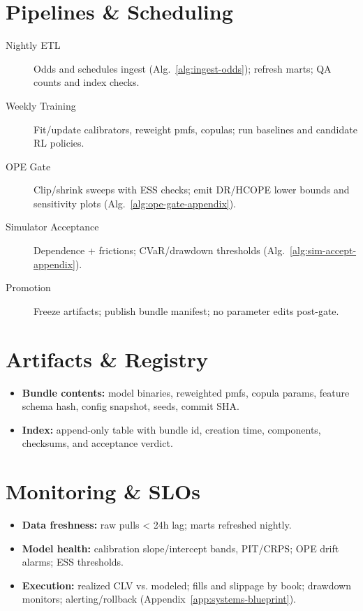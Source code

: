 \section{Pipelines \& Scheduling}
\begin{description}
  \item[Nightly ETL] Odds and schedules ingest (Alg.~\ref{alg:ingest-odds}); refresh marts; QA counts and index checks.
  \item[Weekly Training] Fit/update calibrators, reweight pmfs, copulas; run baselines and candidate RL policies.
  \item[OPE Gate] Clip/shrink sweeps with ESS checks; emit DR/HCOPE lower bounds and sensitivity plots (Alg.~\ref{alg:ope-gate-appendix}).
  \item[Simulator Acceptance] Dependence + frictions; CVaR/drawdown thresholds (Alg.~\ref{alg:sim-accept-appendix}).
  \item[Promotion] Freeze artifacts; publish bundle manifest; no parameter edits post-gate.
\end{description}

\section{Artifacts \& Registry}
\begin{itemize}
  \item \textbf{Bundle contents:} model binaries, reweighted pmfs, copula params, feature schema hash, config snapshot, seeds, commit SHA.
  \item \textbf{Index:} append-only table with bundle id, creation time, components, checksums, and acceptance verdict.
\end{itemize}

\section{Monitoring \& SLOs}
\begin{itemize}
  \item \textbf{Data freshness:} raw pulls < 24h lag; marts refreshed nightly.
  \item \textbf{Model health:} calibration slope/intercept bands, PIT/CRPS; OPE drift alarms; ESS thresholds.
  \item \textbf{Execution:} realized CLV vs. modeled; fills and slippage by book; drawdown monitors; alerting/rollback (Appendix~\ref{app:systems-blueprint}).
\end{itemize}

